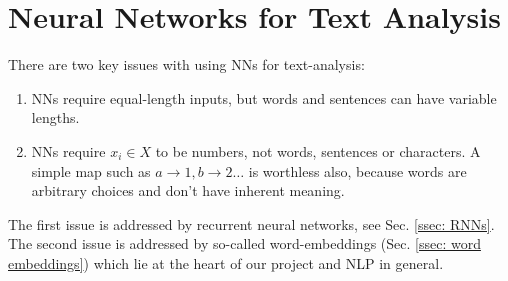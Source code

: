 \section{Neural Networks for Text Analysis \label{sec: NNs for text}}
    There are two key issues with using NNs for text-analysis:
    
    \begin{enumerate}
    \item NNs require equal-length inputs, but words and sentences can have variable lengths.
    \item NNs require $x_i \in X$ to be numbers, not words, sentences or characters. A simple map such as $a \rightarrow 1, b \rightarrow 2 \dots$ is worthless also, because words are arbitrary choices and don't have inherent meaning.
    \end{enumerate}
    

    The first issue is addressed by recurrent neural networks, see Sec. \ref{ssec: RNNs}.
    The second issue is addressed by so-called word-embeddings (Sec. \ref{ssec: word embeddings}) which lie at the heart of our project and NLP in general.